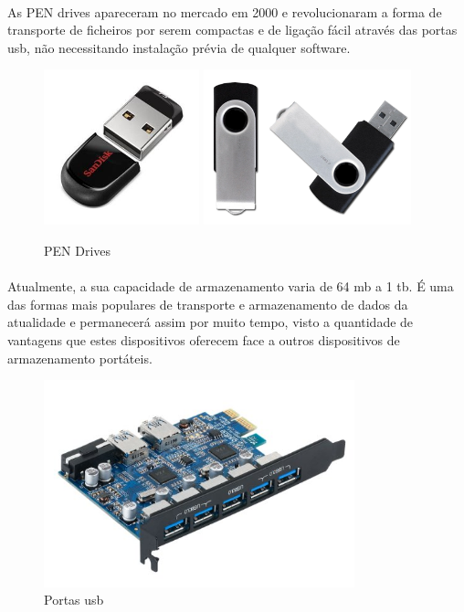 \documentclass[a4paper]{report}
\begin{document}
\paragraph*{}As PEN drives apareceram no mercado em 2000 e revolucionaram a forma de transporte de ficheiros por serem compactas e de ligação fácil através das portas \ac{usb}, não necessitando instalação prévia de qualquer software.

\begin{figure}[H]
\center
\includegraphics[width=4.5cm]{Imagens/pen.jpg}
\includegraphics[width=6cm]{Imagens/pen2.png}
\caption{PEN Drives}
\end{figure}

\paragraph*{}Atualmente, a sua capacidade de armazenamento varia de 64 \ac{mb} a 1 \ac{tb}. É uma das formas mais populares de transporte e armazenamento de dados da atualidade e permanecerá assim por muito tempo, visto a quantidade de vantagens que estes dispositivos oferecem face a outros dispositivos de armazenamento portáteis.

\begin{figure}[H]
\center
\includegraphics[width=9cm]{Imagens/porta_usb.jpg}
\caption{Portas \ac{usb}}
\end{figure}
\end{document}
